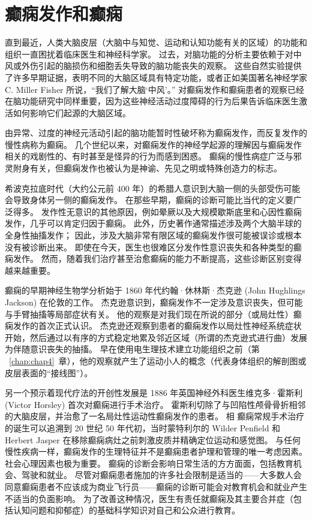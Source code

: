 \chapter{癫痫发作和癫痫} \label{chap:chap58}

直到最近，人类大脑皮层（大脑中与知觉、运动和认知功能有关的区域）的功能和组织一直困扰着临床医生和神经科学家。
过去，对脑功能的分析主要依赖于对中风或外伤引起的脑损伤和细胞丢失导致的脑功能丧失的观察。
这些自然实验提供了许多早期证据，表明不同的大脑区域具有特定功能，或者正如美国著名神经学家 C. Miller Fisher 所说，“我们了解大脑‘中风’。”
对癫痫发作和癫痫患者的观察已经 在脑功能研究中同样重要，因为这些神经活动过度障碍的行为后果告诉临床医生激活如何影响它们起源的大脑区域。


由异常、过度的神经元活动引起的脑功能暂时性破坏称为癫痫发作，而反复发作的慢性病称为癫痫。
几个世纪以来，对癫痫发作的神经学起源的理解因与癫痫发作相关的戏剧性的、有时甚至是怪异的行为而感到困惑。
癫痫的慢性病症广泛与邪灵附身有关，但癫痫发作也被认为是神谕、先见之明或特殊创造力的标志。


希波克拉底时代（大约公元前 400 年）的希腊人意识到大脑一侧的头部受伤可能会导致身体另一侧的癫痫发作。
在那些早期，癫痫的诊断可能比当代的定义要广泛得多。
发作性无意识的其他原因，例如晕厥以及大规模歇斯底里和心因性癫痫发作，几乎可以肯定归因于癫痫。
此外，历史著作通常描述涉及两个大脑半球的全身性抽搐发作；
因此，涉及大脑非常有限区域的癫痫发作很可能被误诊或根本没有被诊断出来。
即使在今天，医生也很难区分发作性意识丧失和各种类型的癫痫发作。
然而，随着我们治疗甚至治愈癫痫的能力不断提高，这些诊断区别变得越来越重要。


癫痫的早期神经生物学分析始于 1860 年代约翰·休林斯·杰克逊 (John Hughlings Jackson) 在伦敦的工作。
杰克逊意识到，癫痫发作不一定涉及意识丧失，但可能与手臂抽搐等局部症状有关。
他的观察是对我们现在所说的部分（或局灶性）癫痫发作的首次正式认识。
杰克逊还观察到患者的癫痫发作以局灶性神经系统症状开始，然后通过以有序的方式稳定地累及邻近区域（所谓的杰克逊式进行曲）发展为伴随意识丧失的抽搐。
早在使用电生理技术建立功能组织之前（第 ~\ref{chap:chap4}~章），他的观察就产生了运动小人的概念（代表身体组织的解剖图或皮层表面的“接线图”）。


另一个预示着现代疗法的开创性发展是 1886 年英国神经外科医生维克多·霍斯利 (Victor Horsley) 首次对癫痫进行手术治疗。
霍斯利切除了与凹陷性颅骨骨折相邻的大脑皮层，并治愈了一名局灶性运动性癫痫发作的患者。
相 癫痫常规手术治疗的诞生可以追溯到 20 世纪 50 年代初，当时蒙特利尔的 Wilder Penfield 和 Herbert Jasper 在移除癫痫病灶之前刺激皮质并精确定位运动和感觉图。
与任何慢性疾病一样，癫痫发作的生理特征并不是癫痫患者护理和管理的唯一考虑因素。
社会心理因素也极为重要。 癫痫的诊断会影响日常生活的方方面面，包括教育机会、驾驶和就业。
尽管对癫痫患者施加的许多社会限制是适当的——大多数人会同意癫痫患者不应该成为商业飞行员——癫痫的诊断可能会对教育机会和就业产生不适当的负面影响。
为了改善这种情况，医生有责任就癫痫及其主要合并症（包括认知问题和抑郁症）的基础科学知识对自己和公众进行教育。



